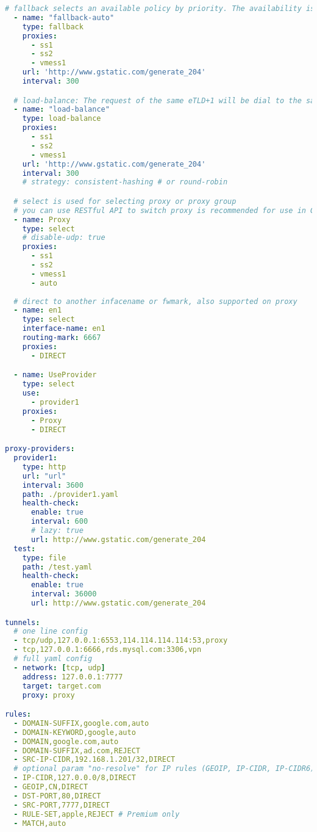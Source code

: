 \documentclass{ctexart}
\begin{document}
\begin{lstlisting}[breaklines=true,language=yaml,style=yaml]
  # fallback selects an available policy by priority. The availability is tested by accessing an URL, just like an auto url-test group.
  - name: "fallback-auto"
    type: fallback
    proxies:
      - ss1
      - ss2
      - vmess1
    url: 'http://www.gstatic.com/generate_204'
    interval: 300

  # load-balance: The request of the same eTLD+1 will be dial to the same proxy.
  - name: "load-balance"
    type: load-balance
    proxies:
      - ss1
      - ss2
      - vmess1
    url: 'http://www.gstatic.com/generate_204'
    interval: 300
    # strategy: consistent-hashing # or round-robin

  # select is used for selecting proxy or proxy group
  # you can use RESTful API to switch proxy is recommended for use in GUI.
  - name: Proxy
    type: select
    # disable-udp: true
    proxies:
      - ss1
      - ss2
      - vmess1
      - auto
 
  # direct to another infacename or fwmark, also supported on proxy
  - name: en1
    type: select
    interface-name: en1
    routing-mark: 6667
    proxies:
      - DIRECT 

  - name: UseProvider
    type: select
    use:
      - provider1
    proxies:
      - Proxy
      - DIRECT

proxy-providers:
  provider1:
    type: http
    url: "url"
    interval: 3600
    path: ./provider1.yaml
    health-check:
      enable: true
      interval: 600
      # lazy: true
      url: http://www.gstatic.com/generate_204
  test:
    type: file
    path: /test.yaml
    health-check:
      enable: true
      interval: 36000
      url: http://www.gstatic.com/generate_204

tunnels:
  # one line config
  - tcp/udp,127.0.0.1:6553,114.114.114.114:53,proxy
  - tcp,127.0.0.1:6666,rds.mysql.com:3306,vpn
  # full yaml config
  - network: [tcp, udp]
    address: 127.0.0.1:7777
    target: target.com
    proxy: proxy

rules:
  - DOMAIN-SUFFIX,google.com,auto
  - DOMAIN-KEYWORD,google,auto
  - DOMAIN,google.com,auto
  - DOMAIN-SUFFIX,ad.com,REJECT
  - SRC-IP-CIDR,192.168.1.201/32,DIRECT
  # optional param "no-resolve" for IP rules (GEOIP, IP-CIDR, IP-CIDR6)
  - IP-CIDR,127.0.0.0/8,DIRECT
  - GEOIP,CN,DIRECT
  - DST-PORT,80,DIRECT
  - SRC-PORT,7777,DIRECT
  - RULE-SET,apple,REJECT # Premium only
  - MATCH,auto
\end{lstlisting}
\end{document}
